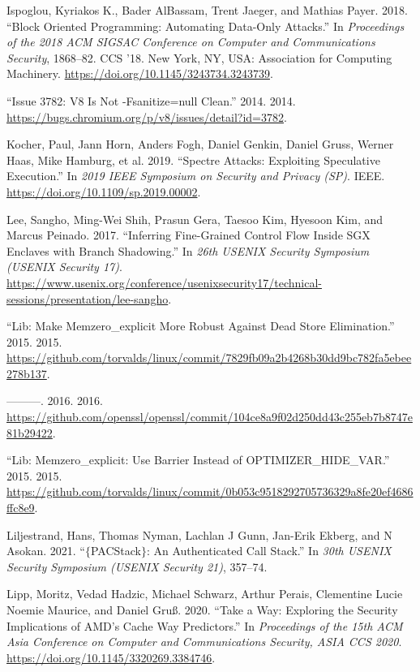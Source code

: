 \documentclass[
  a4paper,
]{report}
\newlength{\cslhangindent}
\newlength{\cslentryspacingunit} %
\newenvironment{CSLReferences}[2] %
 {%
  \setlength{\parindent}{0pt}
  \ifodd #1
  \let\oldpar\par
  \def\par{\hangindent=\cslhangindent\oldpar}
  \fi
  \setlength{\parskip}{#2\cslentryspacingunit}
 }%
 {}
\begin{document}
\begin{CSLReferences}{1}{0}
\leavevmode{}%
Ispoglou, Kyriakos K., Bader AlBassam, Trent Jaeger, and Mathias Payer.
2018. {``Block Oriented Programming: Automating Data-Only Attacks.''} In
\emph{Proceedings of the 2018 ACM SIGSAC Conference on Computer and
Communications Security}, 1868--82. CCS '18. New York, NY, USA:
Association for Computing Machinery.
\url{https://doi.org/10.1145/3243734.3243739}.

\leavevmode{}%
{``Issue 3782: V8 Is Not -Fsanitize=null Clean.''} 2014. 2014.
\url{https://bugs.chromium.org/p/v8/issues/detail?id=3782}.

\leavevmode{}%
Kocher, Paul, Jann Horn, Anders Fogh, Daniel Genkin, Daniel Gruss,
Werner Haas, Mike Hamburg, et al. 2019. {``Spectre Attacks: Exploiting
Speculative Execution.''} In \emph{2019 {IEEE} Symposium on Security and
Privacy ({SP})}. {IEEE}. \url{https://doi.org/10.1109/sp.2019.00002}.

\leavevmode{}%
Lee, Sangho, Ming-Wei Shih, Prasun Gera, Taesoo Kim, Hyesoon Kim, and
Marcus Peinado. 2017. {``Inferring Fine-Grained Control Flow Inside
{SGX} Enclaves with Branch Shadowing.''} In \emph{26th USENIX Security
Symposium (USENIX Security 17)}.
\url{https://www.usenix.org/conference/usenixsecurity17/technical-sessions/presentation/lee-sangho}.

\leavevmode{}%
{``Lib: Make Memzero\_explicit More Robust Against Dead Store
Elimination.''} 2015. 2015.
\url{https://github.com/torvalds/linux/commit/7829fb09a2b4268b30dd9bc782fa5ebee278b137}.

\leavevmode{}%
---------. 2016. 2016.
\url{https://github.com/openssl/openssl/commit/104ce8a9f02d250dd43c255eb7b8747e81b29422}.

\leavevmode{}%
{``Lib: Memzero\_explicit: Use Barrier Instead of
{OPTIMIZER\_HIDE\_VAR}.''} 2015. 2015.
\url{https://github.com/torvalds/linux/commit/0b053c9518292705736329a8fe20ef4686ffc8e9}.

\leavevmode{}%
Liljestrand, Hans, Thomas Nyman, Lachlan J Gunn, Jan-Erik Ekberg, and N
Asokan. 2021. {``\(\{\)PACStack\(\}\): An Authenticated Call Stack.''}
In \emph{30th USENIX Security Symposium (USENIX Security 21)}, 357--74.

\leavevmode{}%
Lipp, Moritz, Vedad Hadzic, Michael Schwarz, Arthur Perais, Clementine
Lucie Noemie Maurice, and Daniel Gruß. 2020. {``Take a Way: Exploring
the Security Implications of AMD's Cache Way Predictors.''} In
\emph{Proceedings of the 15th ACM Asia Conference on Computer and
Communications Security, ASIA CCS 2020}.
\url{https://doi.org/10.1145/3320269.3384746}.


\end{CSLReferences}
\end{document}
